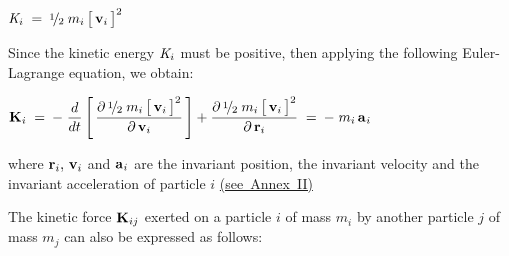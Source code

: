 \documentclass[10pt]{article}
\newcommand{\med}{\raise.5ex\hbox{$\scriptstyle 1$}\kern-.15em/\kern-.09em\lower.25ex\hbox{$\scriptstyle 2$}}
\begin{document}
\par \bigskip ${\mathit{K}}_{\hspace{+0.009em}i} \;=\: \med \; m_i \, \big[ \, {\mathbf{v}}_i \, \big]^2$

\vspace{+0.03em}

\par \bigskip \noindent Since the kinetic energy ${\mathit{K}}_{\hspace{+0.009em}i}$ must be positive, then applying the following Euler-Lagrange equation, we obtain:

\vspace{+0.06em}

\par \bigskip ${\mathbf{K}}_{\hspace{+0.009em}i} \;=\: - \; \dfrac{d}{dt} \, \Bigg[ \, \dfrac{\partial{\, \med \; m_i \, \big[ \, {\mathbf{v}}_i \, \big]^2}}{\partial{\,\mathbf{v}}_i} \, \Bigg] + \dfrac{\partial{\, \med \; m_i \, \big[ \, {\mathbf{v}}_i \, \big]^2}}{\partial{\,\mathbf{r}}_i} \;=\: - \; m_i \, {\mathbf{a}}_{\hspace{+0.045em}i}$

\vspace{+0.09em}

\par \bigskip \noindent where ${\mathbf{r}}_i, \hspace{+0.180em} {\mathbf{v}}_i$ and ${\mathbf{a}}_{\hspace{+0.045em}i}$ are the invariant position, the invariant velocity and the invariant \hbox {acceleration} of particle $i$ \hbox {\hyperlink{a1p2}{(\hspace{+0.09em}see Annex II\hspace{+0.120em})}}

\newpage

\par {}

\par {}

\par \bigskip \noindent The kinetic force ${\mathbf{K}}_{\hspace{+0.009em}ij}$ exerted on a particle $i$ of mass $m_i$ by another particle $j$ of mass $m_j$ can also be expressed as follows:
\end{document}
